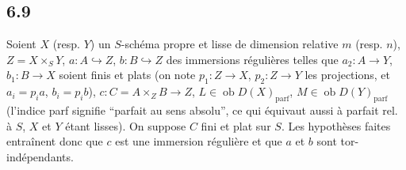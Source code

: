 \documentclass[11pt]{article}
\newcommand{\ob}{\operatorname{ob}}
\providecommand{\parf}{\mathrm{parf}}
\providecommand{\ob}{\operatorname{ob}}
\providecommand{\parf}{\mathrm{parf}}
\begin{document}
\subsection*{6.9}

Soient $X$ (resp. $Y$) un $S$-schéma propre et lisse de dimension relative $m$ (resp. $n$), $Z=X\times_S Y$, $a:A\hookrightarrow Z$, $b:B\hookrightarrow Z$ des immersions régulières telles que $a_2:A\to Y$, $b_1:B\to X$ soient finis et plats (on note $p_1:Z\to X$, $p_2:Z\to Y$ les projections, et $a_i=p_i a$, $b_i=p_i b$), $c:C=A\times_Z B\to Z$, $L\in\ob D(X)_{\parf}$, $M\in\ob D(Y)_{\parf}$ (l'indice parf signifie ``parfait au sens absolu'', ce qui équivaut aussi à parfait rel. à $S$, $X$ et $Y$ étant lisses). On suppose $C$ fini et plat sur $S$. Les hypothèses faites entraînent donc que $c$ est une immersion régulière et que $a$ et $b$ sont tor-indépendants.
\end{document}
